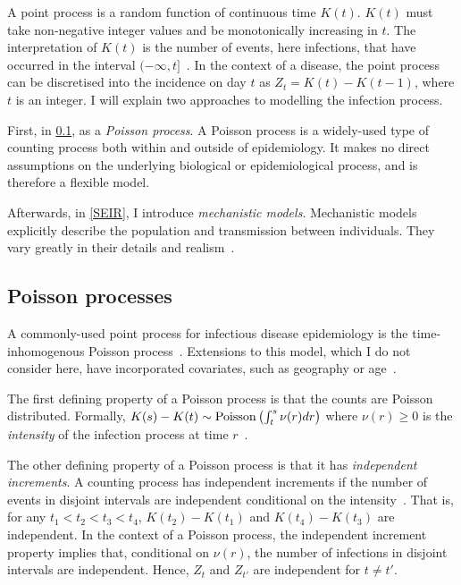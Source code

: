\documentclass[thesis.tex]{subfiles}
\begin{document}
A point process is a random function of continuous time $K(t)$.
$K(t)$ must take non-negative integer values and be monotonically increasing in $t$.
The interpretation of $K(t)$ is the number of events, here infections, that have occurred in the interval $(-\infty, t]$~\autocites[244]{yanDistribution}.
In the context of a disease, the point process can be discretised into the incidence on day $t$ as $Z_t = K(t) - K(t-1)$, where $t$ is an integer.
I will explain two approaches to modelling the infection process.

First, in \cref{inc-prev:sec:poisson-process}, as a \emph{Poisson process}.
A Poisson process is a widely-used type of counting process both within and outside of epidemiology.
It makes no direct assumptions on the underlying biological or epidemiological process, and is therefore a flexible model.

Afterwards, in \cref{SEIR}, I introduce \emph{mechanistic models}.
Mechanistic models explicitly describe the population and transmission between individuals.
They vary greatly in their details and realism~\autocite{murilloMultiscale}.

\subsection{Poisson processes} \label{inc-prev:sec:poisson-process}

A commonly-used point process for infectious disease epidemiology is the time-inhomogenous Poisson process~\autocites[e.g., in the context of HIV,][]{brookmeyerMethod}{paganoHIV}{rosenbergBackcalculation}{brookmeyerBackcalculation}.
Extensions to this model, which I do not consider here, have incorporated covariates, such as geography or age~\autocite[e.g.][]{diggleModeling}.

The first defining property of a Poisson process is that the counts are Poisson distributed.
Formally, $K(s) - K(t) \sim \operatorname{Poisson}\left(\int^s_t \nu(r) dr \right)$ where $\nu(r) \geq 0$ is the \emph{intensity} of the infection process at time $r$~\autocites[244]{yanDistribution}.

The other defining property of a Poisson process is that it has \emph{independent increments}.
A counting process has independent increments if the number of events in disjoint intervals are independent conditional on the intensity~\autocite[244]{yanDistribution}.
That is, for any $t_1 < t_2 < t_3 < t_4$, $K(t_2) - K(t_1)$ and $K(t_4) - K(t_3)$ are independent.
In the context of a Poisson process, the independent increment property implies that, conditional on $\nu(r)$, the number of infections in disjoint intervals are independent.
Hence, $Z_t$ and $Z_{t'}$ are independent for $t \neq t'$.
\end{document}
